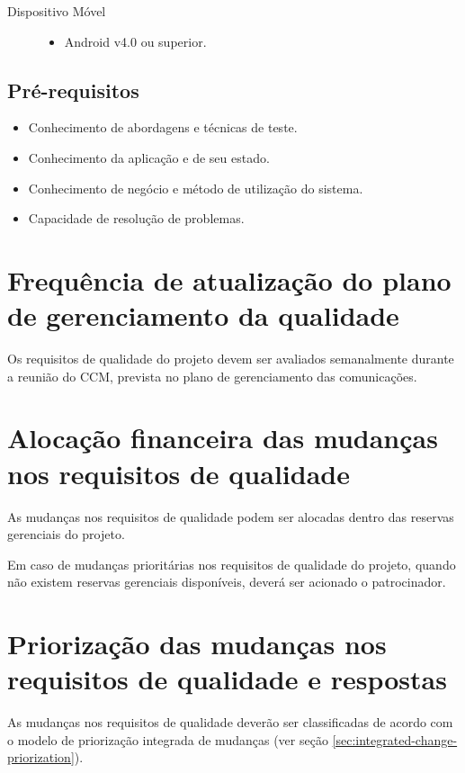 \begin{description}
	\item[Dispositivo Móvel] \hfill
	\begin{itemize}
		\item Android v4.0 ou superior.
	\end{itemize}
\end{description}

\subsection{Pré-requisitos}

\begin{itemize}
	\item Conhecimento de abordagens e técnicas de teste.
	\item Conhecimento da aplicação e de seu estado.
	\item Conhecimento de negócio e método de utilização do sistema.
	\item Capacidade de resolução de problemas.
\end{itemize}

\section{Frequência de atualização do plano de gerenciamento da qualidade}

Os requisitos de qualidade do projeto devem ser avaliados semanalmente durante a reunião do CCM, prevista no plano de gerenciamento das comunicações.

\section{Alocação financeira das mudanças nos requisitos de qualidade}

As mudanças nos requisitos de qualidade podem ser alocadas dentro das reservas gerenciais do projeto.

Em caso de mudanças prioritárias nos requisitos de qualidade do projeto, quando não existem reservas gerenciais disponíveis, deverá ser acionado o patrocinador.

\section{Priorização das mudanças nos requisitos de qualidade e respostas}

As mudanças nos requisitos de qualidade deverão ser classificadas de acordo com o modelo de priorização integrada de mudanças (ver seção \ref{sec:integrated-change-priorization}).

